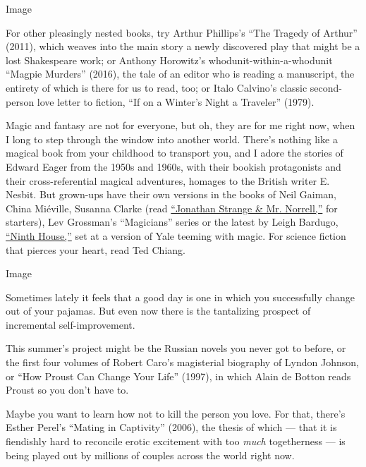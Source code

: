 Image

For other pleasingly nested books, try Arthur Phillips's ``The Tragedy
of Arthur'' (2011), which weaves into the main story a newly discovered
play that might be a lost Shakespeare work; or Anthony Horowitz's
whodunit-within-a-whodunit ``Magpie Murders'' (2016), the tale of an
editor who is reading a manuscript, the entirety of which is there for
us to read, too; or Italo Calvino's classic second-person love letter to
fiction, ``If on a Winter's Night a Traveler'' (1979).

Magic and fantasy are not for everyone, but oh, they are for me right
now, when I long to step through the window into another world. There's
nothing like a magical book from your childhood to transport you, and I
adore the stories of Edward Eager from the 1950s and 1960s, with their
bookish protagonists and their cross-referential magical adventures,
homages to the British writer E. Nesbit. But grown-ups have their own
versions in the books of Neil Gaiman, China Miéville, Susanna Clarke
(read
\href{https://www.nytimes.com/2004/09/05/books/review/jonathan-strange-mr-norrell39-hogwarts-for-grownups.html}{``Jonathan
Strange \& Mr. Norrell,''} for starters), Lev Grossman's ``Magicians''
series or the latest by Leigh Bardugo,
\href{https://www.nytimes.com/2019/10/03/books/leigh-bardugo-ninth-house.html}{``Ninth
House,''} set at a version of Yale teeming with magic. For science
fiction that pierces your heart, read Ted Chiang.

Image

Sometimes lately it feels that a good day is one in which you
successfully change out of your pajamas. But even now there is the
tantalizing prospect of incremental self-improvement.

This summer's project might be the Russian novels you never got to
before, or the first four volumes of Robert Caro's magisterial biography
of Lyndon Johnson, or ``How Proust Can Change Your Life'' (1997), in
which Alain de Botton reads Proust so you don't have to.

Maybe you want to learn how not to kill the person you love. For that,
there's Esther Perel's ``Mating in Captivity'' (2006), the thesis of
which --- that it is fiendishly hard to reconcile erotic excitement with
too \emph{much} togetherness --- is being played out by millions of
couples across the world right now.

